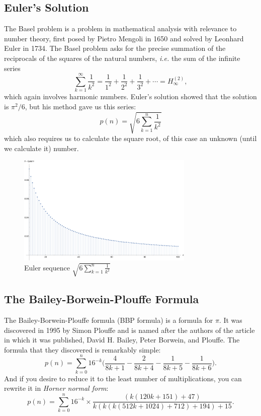 \subsection{Euler's Solution}

The Basel problem is a problem in mathematical analysis with relevance
to number theory, first posed by Pietro Mengoli in 1650 and solved by
Leonhard Euler in 1734.  The Basel problem asks for the precise
summation of the reciprocals of the squares of the natural numbers,
\emph{i.e.}\xspace the sum of the infinite series
$$\sum_{k=1}^\infty
\frac{1}{k^2} = \frac{1}{1^2} + \frac{1}{2^2} + \frac{1}{3^2} + \cdots = H_{\infty }^{(2)},$$
which again involves harmonic numbers.
Euler's solution showed that the solution is ${\pi^2}/6$, but his method
gave us this series: $$p(n)=\sqrt{6 \sum_{k=1}^n \frac{1}{k^2}}$$ which
also requires us to calculate the square root, of this case an unknown
(until we calculate it) number.

\begin{figure}
  \centerline{\includegraphics[width=0.75\textwidth]{figures/Euler.pdf}}
  \caption{Euler sequence $\sqrt{6 \sum _{k=1}^n \frac{1}{k^2}}$}
\end{figure}

\subsection{The Bailey-Borwein-Plouffe Formula}

The Bailey-Borwein-Plouffe formula (BBP formula) is a formula for $\pi$.
It was discovered in 1995 by Simon Plouffe and is named after the
authors of the article in which it was published, David H.\xspace
Bailey, Peter Borwein, and Plouffe. The formula that they discovered is
remarkably simple:
$$
p(n)=\sum _{k=0}^n {16^{-k}}\Biggl ( {\frac{4}{8 k+1}-\frac{2}{8
  k+4}-\frac{1}{8 k+5}-\frac{1}{8 k+6}} \Biggl ) .
$$
And if you desire to reduce it to the least number of multiplications,
you can rewrite it in \emph{Horner normal form}:
$$
p(n)=\sum _{k=0}^n {16^{-k}}\times \frac{ (k (120 k+151)+47)}{k (k (k
(512 k+1024)+712)+194)+15} .
$$

